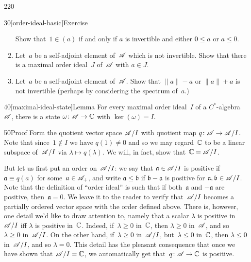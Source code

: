 \begin{parsec}{220}
\begin{point}{30}[order-ideal-basic]{Exercise}
\begin{enumerate}
Show that~$1\in (a)$ if and only if $a$ is invertible
and either $0\leq a$ or $a\leq 0$.

\item
Let~$a$ be a self-adjoint element of~$\mathscr{A}$ which
is not invertible.
Show that there is a maximal order ideal~$J$
of~$\mathscr{A}$
with $a\in J$.

\item
Let~$a$ be a self-adjoint element of~$\mathscr{A}$.
Show that  $\|a\|-a$
or $\|a\|+a$ is not invertible
(perhaps by considering the spectrum of~$a$.)
\end{enumerate}
\end{point}
\begin{point}{40}[maximal-ideal-state]{Lemma}%
For every maximal order ideal~$I$ of a $C^*$-algebra~$\mathscr{A}$,
 there is a state $\omega \colon \mathscr{A}\to \mathbb{C}$
with $\ker(\omega)=I$.
\begin{point}{50}{Proof}%
Form the quotient vector space $\mathscr{A}/I$
with quotient map $q\colon \mathscr{A}\to \mathscr{A}/I$.
Note that since~$1\notin I$
we have $q(1)\neq 0$
and so we may regard~$\mathbb{C}$ 
to be a linear subspace of~$\mathscr{A}/I$
via $\lambda\mapsto q(\lambda)$.
We will, in fact, show that~$\mathbb{C}=\mathscr{A}/I$.

But let us first put an order on~$\mathscr{A}/I$:
we say that $\mathfrak{a}\in \mathscr{A}/I$ is positive
if $\mathfrak{a}\equiv q(a)$ for some~$a\in\mathscr{A}_{+}$,
and write $\mathfrak{a}\leq \mathfrak{b}$ 
if $\mathfrak{b}-\mathfrak{a}$ is positive
for $\mathfrak{a},\mathfrak{b}\in\mathscr{A}/I$.
Note that the definition of ``order ideal'' is such
that if both~$\mathfrak{a}$ and $-\mathfrak{a}$ are positive,
then~$\mathfrak{a}=0$.
We leave it to the reader to verify 
that~$\mathscr{A}/I$ becomes a partially ordered vector space
with the order defined above.
There is, however,
one detail we'd like to draw attention to,
namely that a scalar $\lambda$ is positive in~$\mathscr{A}/I$
iff $\lambda$ is positive in~$\mathbb{C}$.
Indeed, if~$\lambda\geq 0$ in~$\mathbb{C}$,
then $\lambda\geq 0$ in~$\mathscr{A}$, and so~$\lambda \geq 0$ in~$\mathscr{A}/I$.
On the other hand,
if~$\lambda\geq 0$ in~$\mathscr{A}/I$, but~$\lambda\leq 0$ in~$\mathbb{C}$,
then $\lambda\leq 0$ in~$\mathscr{A}/I$,
and so $\lambda=0$.
This detail
has the pleasant consequence
that once we have shown that~$\mathscr{A}/I=\mathbb{C}$,
we automatically get that~$q\colon \mathscr{A}\to\mathbb{C}$ is positive.


\end{point}
\end{point}
\end{parsec}
